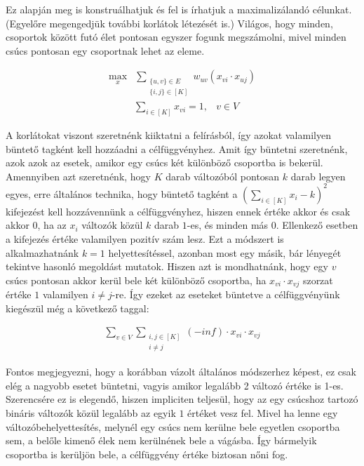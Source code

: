 Ez alapján meg is konstruálhatjuk és fel is írhatjuk a maximalizálandó célunkat. (Egyelőre megengedjük további korlátok létezését is.) Világos, hogy minden, csoportok között futó élet pontosan egyszer fogunk megszámolni, mivel minden csúcs pontosan egy csoportnak lehet az eleme.

\begin{align} \max_{x} &\sum _{\substack{\{{u,v}\} \in E \\ \{{i,j}\} \in [K]}} w_{uv}(x_{vi} \cdot x_{uj}) \end{align}
\begin{align} &\sum _{i \in [K]} x_{vi} = 1, &v \in V \end {align}

A korlátokat viszont szeretnénk kiiktatni a felírásból, így azokat valamilyen büntető tagként kell hozzáadni a célfüggvényhez. Amit így büntetni szeretnénk, azok azok az esetek, amikor egy csúcs két különböző csoportba is bekerül. Amennyiben azt szeretnénk, hogy $K$ darab változóból pontosan $k$ darab legyen egyes, erre általános technika, hogy büntető tagként a $(\sum _{i \in [K]} x_i - k)^2 $ kifejezést kell hozzávennünk a célfüggvényhez, hiszen ennek értéke akkor és csak akkor $0$, ha az $x_i$ változók közül $k$ darab $1$-es, és minden más $0$. Ellenkező esetben a kifejezés értéke valamilyen pozitív szám lesz. Ezt a módszert is alkalmazhatnánk $k=1$ helyettesítéssel, azonban most egy másik, bár lényegét tekintve hasonló megoldást mutatok. Hiszen azt is mondhatnánk, hogy egy $v$ csúcs pontosan akkor kerül bele két különböző csoportba, ha $x_{vi}\cdot x_{vj}$ szorzat értéke $1$ valamilyen $i \neq j$-re. Így ezeket az eseteket büntetve a célfüggvényünk kiegészül még a következő taggal:

\begin{align} \sum _{v \in V } \sum _{\substack{ i,j \in [K] \\  i \neq j}} (-inf) \cdot x_{vi} \cdot x_{vj}
\end{align}

Fontos megjegyezni, hogy a korábban vázolt általános módszerhez képest, ez csak elég a nagyobb esetet büntetni, vagyis amikor legalább 2 változó értéke is 1-es. Szerencsére ez is elegendő, hiszen impliciten teljesül, hogy az egy csúcshoz tartozó bináris változók közül legalább az egyik $1$ értéket vesz fel. Mivel ha lenne egy változóbehelyettesítés, melynél egy csúcs nem kerülne bele egyetlen csoportba sem, a belőle kimenő élek nem kerülnének bele a vágásba. Így bármelyik csoportba is kerüljön bele, a célfüggvény értéke biztosan nőni fog.

